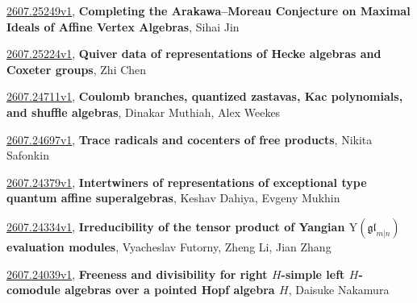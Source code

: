 \documentclass[9pt, a4paper]{article}
\theoremstyle{plain}
\theoremstyle{definition}
\theoremstyle{remark}
\newcommand{\arxiv}[3]{\href{https://arxiv.org/abs/#1}{#1}, \textbf{\textcolor{arxivblue}{#2}}, #3}
\begin{document}
\arxiv{2607.25249v1}{Completing the Arakawa--Moreau Conjecture on Maximal Ideals of Affine Vertex Algebras}{Sihai Jin}

\arxiv{2607.25224v1}{Quiver data of representations of Hecke algebras and Coxeter groups}{Zhi Chen}

\arxiv{2607.24711v1}{Coulomb branches, quantized zastavas, Kac polynomials, and shuffle algebras}{Dinakar Muthiah, Alex Weekes}

\arxiv{2607.24697v1}{Trace radicals and cocenters of free products}{Nikita Safonkin}

\arxiv{2607.24379v1}{Intertwiners of representations of exceptional type quantum affine superalgebras}{Keshav Dahiya, Evgeny Mukhin}

\arxiv{2607.24334v1}{Irreducibility of the tensor product of Yangian \( \mathrm{Y}(\mathfrak{gl}_{m|n}) \) evaluation modules}{Vyacheslav Futorny, Zheng Li, Jian Zhang}

\arxiv{2607.24039v1}{Freeness and divisibility for right $H$-simple left $H$-comodule algebras over a pointed Hopf algebra $H$}{Daisuke Nakamura}

\end{document}

